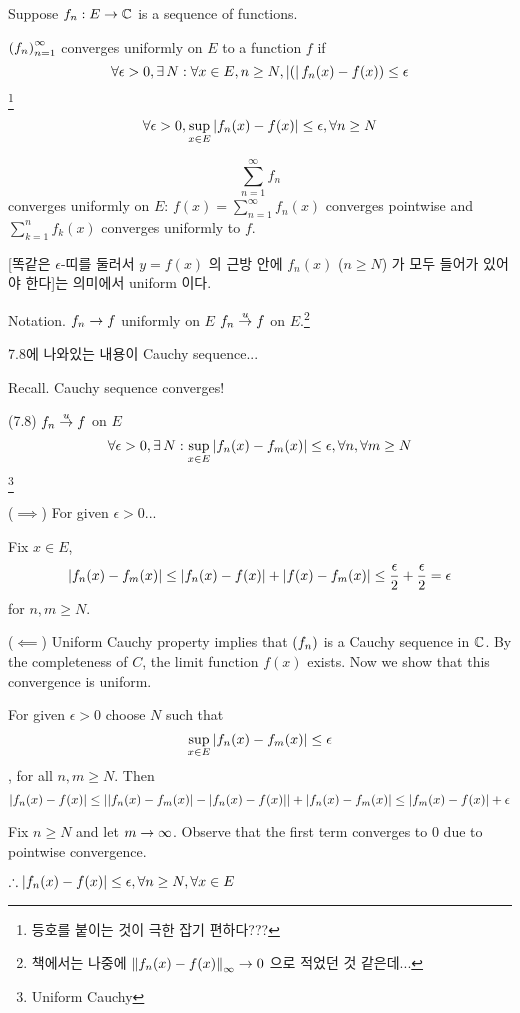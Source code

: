 \begin{defn}
    Suppose \(f_n: E \rightarrow \mathbb{C}\) is a sequence of functions.

    \(\left( f_n \right)_{n=1}^\infty\) converges uniformly on \(E\) to a function \(f\) if
    \[
        \forall \epsilon > 0, \exists N : \forall x \in E, n \geq N, \abs(f_{n}(x) - f(x)) \leq \epsilon
    \]\footnote{등호를 붙이는 것이 극한 잡기 편하다???}

    \[
        \forall \epsilon > 0, \sup_{x \in E} \left|f_n(x) - f(x)\right| \leq \epsilon, \forall n \geq N
    \]

    \[
        \sum_{n = 1}^\infty f_n
    \] converges uniformly on \(E\): \(f(x) = \sum_{n=1}^\infty f_n(x)\) converges pointwise and \(\sum_{k=1}^n f_k(x)\) converges uniformly to \(f\).
\end{defn}

[똑같은 \(\epsilon\)-띠를 둘러서 \(y = f(x)\) 의 근방 안에 \(f_n(x)\) (\(n \geq N\)) 가 모두 들어가 있어야 한다]는 의미에서 uniform 이다.

Notation. \(f_n \rightarrow f\) uniformly on \(E\) \miff \(f_n \overset{u}{\rightarrow} f\) on \(E\).\footnote{책에서는 나중에 \(\left\lVert f_n(x) - f(x)\right\rVert_\infty \rightarrow 0\) 으로 적었던 것 같은데...}

7.8에 나와있는 내용이 Cauchy sequence...

Recall. Cauchy sequence converges!

\begin{theorem}
    (7.8) \(f_n \overset{u}{\rightarrow} f\) on \(E\) \miff
    \[
        \forall \epsilon > 0, \exists N : \sup_{x \in E} \abs{f_n(x) - f_m(x)} \leq \epsilon, \forall n, \forall m \geq N
    \]\footnote{Uniform Cauchy}
\end{theorem}

\begin{pf}
    (\(\implies\)) For given \(\epsilon > 0\)...

    Fix \(x \in E\),
    \[\left|f_n(x) - f_m(x)\right| \leq \left|f_n(x) - f(x)\right| + \left|f(x) - f_m(x)\right| \leq \frac{\epsilon}{2} + \frac{\epsilon}{2} = \epsilon\]
    for \(n, m \geq N\).

    (\(\impliedby\)) Uniform Cauchy property implies that \(\left( f_n \right)\) is a Cauchy sequence in \(\mathbb{C}\). By the completeness of \(C\), the limit function \(f(x)\) exists. Now we show that this convergence is uniform.

    For given \(\epsilon > 0\) choose \(N\) such that
    \[\sup_{x\in E} \left|f_n(x) - f_m(x)\right| \leq \epsilon\], for all \(n, m \geq N\). Then \[\left|f_n(x) - f(x)\right| \leq \left|\left|f_n(x) - f_m(x)\right| - \left|f_n(x) - f(x)\right|\right| + \left|f_n(x) - f_m(x)\right| \leq \left|f_m(x) - f(x)\right| + \epsilon\]

    Fix \(n \geq N\) and let \(m \rightarrow \infty\). Observe that the first term converges to 0 due to pointwise convergence.

    \(\therefore \left|f_n(x) - f(x)\right| \leq \epsilon, \forall n\geq N, \forall x \in E\)
\end{pf}

\pagebreak
